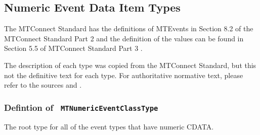 \subsection{Numeric Event Data Item Types} \label{model:NumericEventDataItemTypes}

The MTConnect Standard has the definitions of \glspl{MTEvent} in 
Section 8.2 of the MTConnect Standard Part 2 \cite{MTCPart2} and the definition of the 
values can be found in Section 5.5 of MTConnect Standard Part 3 \cite{MTCPart3}. 

The description of each type was copied from the MTConnect Standard,
but this not the definitive text for each type. For authoritative normative text, 
please refer to the sources \cite{MTCPart2} and \cite{MTCPart3}.


\subsubsection{Defintion of \texttt{ MTNumericEventClassType}}
  \label{type:MTNumericEventClassType}

\FloatBarrier

The root type for all of the event types that have numeric \gls{CDATA}.

